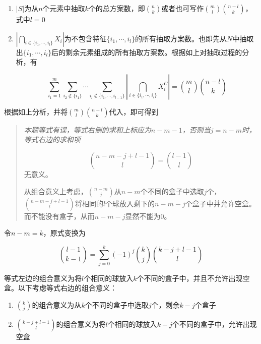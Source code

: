 \documentclass{../notes}
\begin{document}
\begin{subquestions}
        \begin{enumerate}
            \item $|S|$为从$n$个元素中抽取$k$个的总方案数，即$\binom{n}{k}$或者也可写作$\binom{m}{l}\binom{n-l}{k}$，式中$l = 0$
            \item $\left|\bigcap_{i\in\{i_1, \cdots, i_l\}} X_i\right|$为不包含特征$\{i_1, \cdots, i_l\}$的所有抽取方案数。也即先从$N$中抽取出$\{i_1, \cdots, i_l\}$后的剩余元素组成的所有抽取方案数。根据如上对抽取过程的分析，有

            \begin{equation*}
                \sum_{i_{1}=1}^m\sum_{i_{2}\not\in \{i_1\}}\cdots\sum_{i_{l}\not\in \{i_1, \cdots, i_{l-1}\}}\left|\bigcap_{i\in\{i_1, \cdots, i_l\}} X_i^C\right| = \binom{m}{l}\binom{n-l}{k}
            \end{equation*}
        \end{enumerate}

        根据如上分析，并将$\binom{m}{l}\binom{n-l}{k}$代入，即可得到

        \item

        \begin{quote}
            \it
            本题等式有误，等式右侧的求和上标应为$n - m - 1$，否则当$j = n - m$时，等式右边的求和项

            \begin{equation*}
                \binom{n - m - j + l - 1}{l} = \binom{l - 1}{l}
            \end{equation*}
            无意义。

            从组合意义上考虑，$\binom{n - m}{j}$从$n - m$个不同的盒子中选取$j$个，$\binom{n-m-j+l-1}{l}$将相同的$l$个球放入剩下的$n - m - j$个盒子中并允许空盒。而不能没有盒子，从而$n - m - j$显然不能为$0$。
        \end{quote}

        令$n-m=k$，原式变换为

        \begin{equation}
            \binom{l-1}{k-1} = \sum_{j=0}^{k}(-1)^j\binom{k}{j}\binom{k-j+l-1}{l}
            \label{eq:3.4.3}
        \end{equation}

        等式左边的组合意义为将$l$个相同的球放入$k$个不同的盒子中，并且不允许出现空盒。以下考虑等式右边的组合意义：

        \begin{enumerate}
            \item $\binom{k}{j}$的组合意义为从$k$个不同的盒子中选取$j$个，剩余$k-j$个盒子
            \item $\binom{k-j+l-1}{l}$的组合意义为将$l$个相同的球放入$k-j$个不同的盒子中，允许出现空盒
        \end{enumerate}


\end{subquestions}
\end{document}
